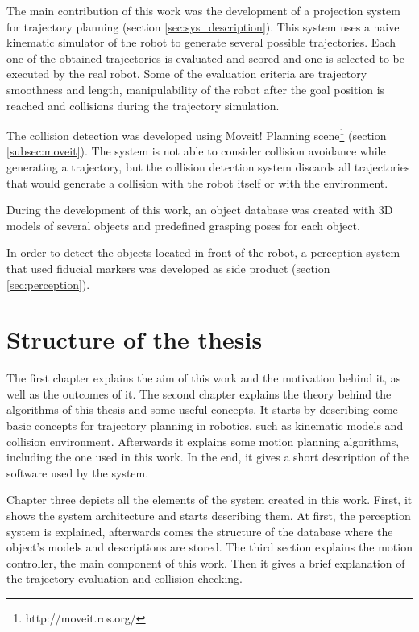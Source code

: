The main contribution of this work was the development of a projection system for trajectory planning (section \ref{sec:sys_description}). This system uses a naive kinematic simulator of the robot to generate several possible trajectories. Each one of the obtained trajectories is evaluated and scored and one is selected to be executed by the real robot. Some of the evaluation criteria are trajectory smoothness and length, manipulability of the robot after the goal position is reached and collisions during the trajectory simulation.

The collision detection was developed using Moveit! Planning scene\footnote{http://moveit.ros.org/} (section \ref{subsec:moveit}). The system is not able to consider collision avoidance while generating a trajectory, but the collision detection system discards all trajectories that would generate a collision with the robot itself or with the environment.

During the development of this work, an object database was created with 3D models of several objects and predefined grasping poses for each object.

In order to detect the objects located in front of the robot, a perception system that used fiducial markers was developed as side product (section \ref{sec:perception}).


\section{Structure of the thesis}

The first chapter explains the aim of this work and the motivation behind it, as well as the outcomes of it. The second chapter explains the theory behind the algorithms of this thesis and some useful concepts. It starts by describing come basic concepts for trajectory planning in robotics, such as kinematic models and collision environment. Afterwards it explains some motion planning algorithms, including the one used in this work. In the end, it gives a short description of the  software used by the system.

Chapter three depicts all the elements of the system created in this work. First, it shows the system architecture and starts describing them. At first, the perception system is explained, afterwards comes the structure of the database where the object's models and descriptions are stored. The third section explains the motion controller, the main component of this work. Then it gives a brief explanation of the trajectory evaluation and collision checking. 





